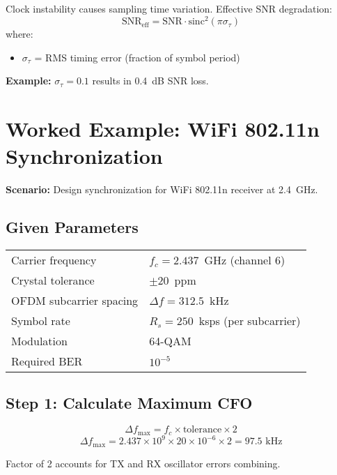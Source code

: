 Clock instability causes sampling time variation. Effective SNR degradation:
\begin{equation}
\text{SNR}_{\text{eff}} = \text{SNR} \cdot \text{sinc}^2(\pi \sigma_\tau)
\end{equation}
where:
\begin{itemize}
\item $\sigma_\tau$ = RMS timing error (fraction of symbol period)
\end{itemize}

\textbf{Example:} $\sigma_\tau = 0.1$ results in 0.4~dB SNR loss.

\section{Worked Example: WiFi 802.11n Synchronization}

\textbf{Scenario:} Design synchronization for WiFi 802.11n receiver at 2.4~GHz.

\subsection*{Given Parameters}

\begin{tabular}{@{}ll@{}}
Carrier frequency & $f_c = 2.437$~GHz (channel 6) \\
Crystal tolerance & $\pm 20$~ppm \\
OFDM subcarrier spacing & $\Delta f = 312.5$~kHz \\
Symbol rate & $R_s = 250$~ksps (per subcarrier) \\
Modulation & 64-QAM \\
Required BER & $10^{-5}$ \\
\end{tabular}

\subsection*{Step 1: Calculate Maximum CFO}

\begin{equation}
\Delta f_{\max} = f_c \times \text{tolerance} \times 2
\end{equation}
\begin{equation}
\Delta f_{\max} = 2.437 \times 10^9 \times 20 \times 10^{-6} \times 2 = 97.5 \text{ kHz}
\end{equation}

Factor of 2 accounts for TX and RX oscillator errors combining.

